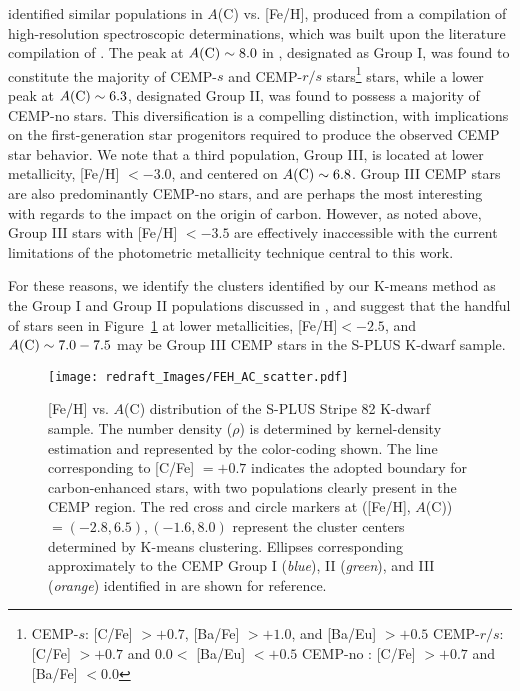 \documentclass[twocolumn,trackchanges]{aastex63}
\begin{document}
\citet{Yoon:2016} identified similar populations in $A$(C) vs. [Fe/H], produced from  a compilation of high-resolution spectroscopic determinations, which was built upon the literature compilation of \citet{Placco:2014}. The peak at $A(\rm{C})\sim 8.0$ in \citet{Yoon:2016}, designated as Group I, was found to constitute the majority of CEMP-$s$ and CEMP-$r/s$ stars\footnote{CEMP-$s$: [C/Fe] $>+0.7$, [Ba/Fe] $ > +1.0$, and [Ba/Eu] $>+0.5$ \newline CEMP-$r/s$: [C/Fe] $ > +0.7$ and $0.0 < $ [Ba/Eu] $ <+0.5$ \newline CEMP-no : [C/Fe] $ > +0.7$ and [Ba/Fe] $ < 0.0$} stars, while a lower peak at $A(\rm{C}) \sim 6.3$, designated Group II, was found to possess a majority of CEMP-no stars. This diversification is a compelling distinction, with implications on the first-generation star progenitors required to produce the observed CEMP star behavior. We note that a third population, Group III, is located at lower metallicity, [Fe/H] $<-3.0$, and centered on $A(\rm{C})\sim 6.8$. Group III CEMP stars are also predominantly CEMP-no stars, and are perhaps the most interesting with regards to the impact on the origin of carbon. However, as noted above, Group III stars with [Fe/H] $<-3.5$ are effectively inaccessible with the current limitations of the photometric metallicity technique central to this work. 

For these reasons, we identify the clusters identified by our K-means method as the Group I and Group II populations discussed in \citet{Yoon:2016}, and suggest that the handful of stars seen in Figure~\ref{fig:YOON_BEERS} at lower metallicities, [Fe/H]$<-2.5$, and $A(\rm{C}) \sim 7.0-7.5$ may be Group III CEMP stars in the S-PLUS K-dwarf sample.  

\begin{figure}
	\centering
	\texttt{[image: redraft\_Images/FEH\_AC\_scatter.pdf]}
	
	\caption{[Fe/H] vs. $A$(C) distribution of the S-PLUS Stripe 82 K-dwarf sample. The number density ($\rho$) is determined by kernel-density estimation and represented by the color-coding shown. The line corresponding to [C/Fe] $=+0.7$ indicates the adopted boundary for carbon-enhanced stars, with two populations clearly present in the CEMP region. The red cross and circle markers at ([Fe/H], $A$(C)) $= (-2.8, 6.5), (-1.6, 8.0)$ represent the cluster centers determined by K-means clustering. Ellipses corresponding approximately to the CEMP Group I (\textit{blue}), II (\textit{green}), and III (\textit{orange}) identified in \citet{Yoon:2016} are shown for reference. \label{fig:YOON_BEERS}}
\end{figure}
\end{document}
